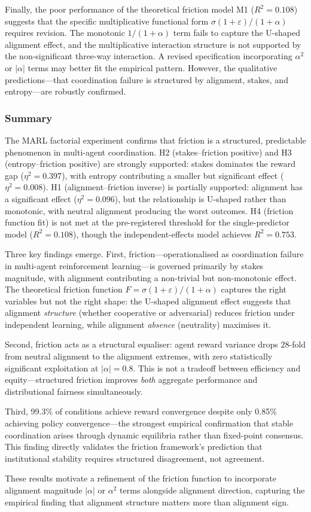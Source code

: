 Finally, the poor performance of the theoretical friction model M1 ($R^2 = 0.108$) suggests that the specific multiplicative functional form $\sigma(1+\varepsilon)/(1+\alpha)$ requires revision. The monotonic $1/(1+\alpha)$ term fails to capture the U-shaped alignment effect, and the multiplicative interaction structure is not supported by the non-significant three-way interaction. A revised specification incorporating $\alpha^2$ or $|\alpha|$ terms may better fit the empirical pattern. However, the qualitative predictions---that coordination failure is structured by alignment, stakes, and entropy---are robustly confirmed.

\subsubsection{Summary}

The MARL factorial experiment confirms that friction is a structured, predictable phenomenon in multi-agent coordination. H2 (stakes--friction positive) and H3 (entropy--friction positive) are strongly supported: stakes dominates the reward gap ($\eta^2 = 0.397$), with entropy contributing a smaller but significant effect ($\eta^2 = 0.008$). H1 (alignment--friction inverse) is partially supported: alignment has a significant effect ($\eta^2 = 0.096$), but the relationship is U-shaped rather than monotonic, with neutral alignment producing the worst outcomes. H4 (friction function fit) is not met at the pre-registered threshold for the single-predictor model ($R^2 = 0.108$), though the independent-effects model achieves $R^2 = 0.753$.

Three key findings emerge. First, friction---operationalised as coordination failure in multi-agent reinforcement learning---is governed primarily by stakes magnitude, with alignment contributing a non-trivial but non-monotonic effect. The theoretical friction function $F = \sigma(1+\varepsilon)/(1+\alpha)$ captures the right variables but not the right shape: the U-shaped alignment effect suggests that alignment \emph{structure} (whether cooperative or adversarial) reduces friction under independent learning, while alignment \emph{absence} (neutrality) maximises it.

Second, friction acts as a structural equaliser: agent reward variance drops 28-fold from neutral alignment to the alignment extremes, with zero statistically significant exploitation at $|\alpha| = 0.8$. This is not a tradeoff between efficiency and equity---structured friction improves \emph{both} aggregate performance and distributional fairness simultaneously.

Third, 99.3\% of conditions achieve reward convergence despite only 0.85\% achieving policy convergence---the strongest empirical confirmation that stable coordination arises through dynamic equilibria rather than fixed-point consensus. This finding directly validates the friction framework's prediction that institutional stability requires structured disagreement, not agreement.

These results motivate a refinement of the friction function to incorporate alignment magnitude $|\alpha|$ or $\alpha^2$ terms alongside alignment direction, capturing the empirical finding that alignment structure matters more than alignment sign.
